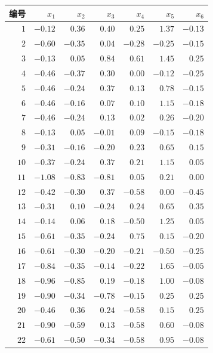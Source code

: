 \begin{mvtable}
\label{tab:5.14}
\centering
{\small
\begin{tabular}{|r|r|r|r|r|r|r|}
\hline
编号 & $x_{1}$ & $x_{2}$ & $x_{3}$ & $x_{4}$ & $x_{5}$ & $x_{6}$\\
\hline
$1$ & $-0.12$ & $0.36$ & $0.40$ & $0.25$ & $1.37$ & $-0.13$\\
$2$ & $-0.60$ & $-0.35$ & $0.04$ & $-0.28$ & $-0.25$ & $-0.15$\\
$3$ & $-0.13$ & $0.05$ & $0.84$ & $0.61$ & $1.45$ & $0.25$\\
$4$ & $-0.46$ & $-0.37$ & $0.30$ & $0.00$ & $-0.12$ & $-0.25$\\
$5$ & $-0.46$ & $-0.24$ & $0.37$ & $0.13$ & $0.78$ & $-0.15$\\
$6$ & $-0.46$ & $-0.16$ & $0.07$ & $0.10$ & $1.15$ & $-0.18$\\
$7$ & $-0.46$ & $-0.24$ & $0.13$ & $0.02$ & $0.26$ & $-0.20$\\
$8$ & $-0.13$ & $0.05$ & $-0.01$ & $0.09$ & $-0.15$ & $-0.18$\\
$9$ & $-0.31$ & $-0.16$ & $-0.20$ & $0.23$ & $0.65$ & $0.15$\\
$10$ & $-0.37$ & $-0.24$ & $0.37$ & $0.21$ & $1.15$ & $0.05$\\
$11$ & $-1.08$ & $-0.83$ & $-0.81$ & $0.05$ & $0.21$ & $0.00$\\
$12$ & $-0.42$ & $-0.30$ & $0.37$ & $-0.58$ & $0.00$ & $-0.45$\\
$13$ & $-0.31$ & $0.10$ & $-0.24$ & $0.24$ & $0.65$ & $0.35$\\
$14$ & $-0.14$ & $0.06$ & $0.18$ & $-0.50$ & $1.25$ & $0.05$\\
$15$ & $-0.61$ & $-0.35$ & $-0.24$ & $0.75$ & $0.15$ & $-0.20$\\
$16$ & $-0.61$ & $-0.30$ & $-0.20$ & $-0.21$ & $-0.50$ & $-0.25$\\
$17$ & $-0.84$ & $-0.35$ & $-0.14$ & $-0.22$ & $1.65$ & $-0.05$\\
$18$ & $-0.96$ & $-0.85$ & $0.19$ & $-0.18$ & $1.00$ & $-0.08$\\
$19$ & $-0.90$ & $-0.34$ & $-0.78$ & $-0.15$ & $0.25$ & $0.25$\\
$20$ & $-0.46$ & $0.36$ & $0.24$ & $-0.58$ & $0.15$ & $0.25$\\
$21$ & $-0.90$ & $-0.59$ & $0.13$ & $-0.58$ & $0.60$ & $-0.08$\\
$22$ & $-0.61$ & $-0.50$ & $-0.34$ & $-0.58$ & $0.95$ & $-0.08$\\

\end{tabular}}
\end{mvtable}
